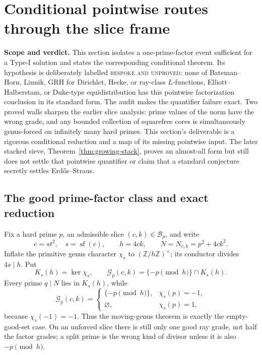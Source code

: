\documentclass[10pt,reqno]{amsart}
\theoremstyle{definition}
\newcommand{\1}{\mathbf 1}
\begin{document}
\section{Conditional pointwise routes through the slice frame}
\label{sec:conditional-slices}
\medskip\noindent\textbf{Scope and verdict.}
This section isolates a one-prime-factor event sufficient for a Type-I
solution and states the corresponding conditional theorem.  Its hypothesis
is deliberately labelled \textsc{bespoke and unproved}: none of
Bateman--Horn, Linnik, GRH for Dirichlet, Hecke, or ray-class $L$-functions,
Elliott--Halberstam, or Duke-type equidistribution has this pointwise
factorization conclusion in its standard form.  The audit makes the
quantifier failure exact.  Two proved walls sharpen the earlier slice
analysis: prime values of the norm have the wrong grade, and any bounded
collection of squarefree cores is simultaneously genus-forced on infinitely
many hard primes.  This section's deliverable is a rigorous conditional
reduction and a map of its missing pointwise input.  The later stacked sieve,
Theorem~\ref{thm:growing-stack}, proves an almost-all form but still does not
settle that pointwise quantifier or claim that a standard conjecture secretly
settles Erd\H{o}s--Straus.

\subsection{The good prime-factor class and exact reduction}
Fix a hard prime $p$, an admissible slice $(c,k)\in\mathcal B_p$, and write
\begin{equation}\tag{50.1}
 c=st^2,\quad s=\operatorname {sf}(c),\qquad
 h=4ck,\qquad N=N_{c,k}=p^2+4ck^2.
\end{equation}
Inflate the primitive genus character $\chi_s$ to
$(\mathbb Z/h\mathbb Z)^\times$; its conductor divides $4s\mid h$.  Put
\begin{equation}\tag{50.2}
 K_s(h)=\ker\chi_s,
 \qquad \mathcal G_p(c,k)=\{-p\pmod h\}\cap K_s(h).
\end{equation}
Every prime $q\mid N$ lies in $K_s(h)$, while
\begin{equation}\tag{50.3}
 \mathcal G_p(c,k)=
 \begin{cases}
   \{-p\pmod h\},&\chi_s(p)=-1,\\
   \varnothing,&\chi_s(p)=1,
 \end{cases}
\end{equation}
because $\chi_s(-1)=-1$.  Thus the moving-genus theorem is exactly the
empty-good-set case.  On an unforced slice there is still only one good ray
grade, not half the factor grades; a split prime is the wrong kind of
divisor unless it is also $-p\pmod h$.
\end{document}
